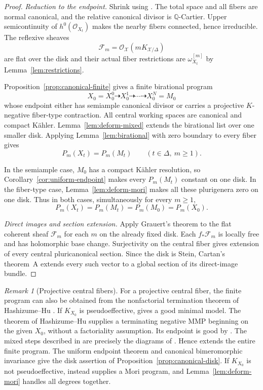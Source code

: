 \documentclass[11pt,a4paper]{article}
\numberwithin{equation}{section}
\theoremstyle{definition}
\theoremstyle{remark}
\newtheorem{remark}[theorem]{Remark}
\newcommand{\Q}{\mathbb Q}\newcommand{\R}{\mathbb R}
\newcommand{\OO}{\mathcal O}\newcommand{\cX}{\mathcal X}
\begin{document}
\begin{proof}
\emph{Reduction to the endpoint.}
Shrink using \cite[Lemma~10 and Remark~10.3]{Kollar2021}.
The total space and all fibers are normal canonical, and the
relative canonical divisor is $\Q$-Cartier. Upper semicontinuity of
$h^0(\OO_{X_t})$ makes the nearby fibers connected, hence irreducible.
The reflexive sheaves
\[
 \mathcal F_m=\OO_{\mathcal X}(mK_{\mathcal X/\Delta})
\]
are flat over the disk and their actual fiber restrictions are
$\omega_{X_t}^{[m]}$ by Lemma~\ref{lem:restrictions}.

Proposition~\ref{prop:canonical-finite} gives a finite
birational program
\[
 X_0=X_0^0\dashrightarrow X_0^1\dashrightarrow\cdots
 \dashrightarrow X_0^N=M_0
\]
whose endpoint either has semiample canonical divisor or carries
a projective $K$-negative fiber-type contraction.
All central working spaces are canonical and compact Kähler.
Lemma~\ref{lem:deform-mixed} extends the birational list over
one smaller disk. Applying Lemma~\ref{lem:birational} with zero
boundary to every fiber gives
\begin{equation}\label{eq:canonical-birational-invariance}
 P_m(X_t)=P_m(M_t)\qquad(t\in\Delta,\ m\ge1).
\end{equation}

In the semiample case, $M_0$ has a compact Kähler resolution,
so Corollary~\ref{cor:uniform-endpoint} makes every $P_m(M_t)$
constant on one disk. In the fiber-type case,
Lemma~\ref{lem:deform-mori} makes all these plurigenera zero on
one disk. Thus in both cases, simultaneously for every $m\ge1$,
\[
 P_m(X_t)=P_m(M_t)=P_m(M_0)=P_m(X_0).
\]

\smallskip\noindent\emph{Direct images and section extension.}
Apply Grauert's theorem to the flat coherent sheaf
$\mathcal F_m$ for each $m$ on the already fixed disk.
Each $f_*\mathcal F_m$ is locally free and has holomorphic base
change. Surjectivity on the central fiber gives extension of every
central pluricanonical section. Since the disk is Stein, Cartan's theorem~A extends every such
vector to a global section of its direct-image bundle.
\end{proof}

\begin{remark}[Projective central fibers]
For a projective central fiber, the finite program can also be obtained
from the nonfactorial termination theorem of Hashizume--Hu
\cite[Theorem~1.7]{HH2020}. If $K_{X_0}$ is
pseudoeffective, \cite[Proposition~2.10]{OAI034} gives a good
minimal model. The theorem of Hashizume--Hu supplies a terminating
negative MMP beginning on the given $X_0$, without a factoriality
assumption. Its endpoint is
good by \cite[Lemma~2.10]{TX2024}. The mixed steps described in
\cite[Remark~2.15]{TX2024} are precisely the diagrams of
\cite[Definition~7]{Kollar2021}. Hence
\cite[Theorem~2]{Kollar2021} extends the entire finite program.
The uniform endpoint theorem and canonical bimeromorphic invariance
give the disk assertion of Proposition~\ref{prop:canonical-disk}.
If $K_{X_0}$ is not pseudoeffective,
\cite[Theorem~1.7]{HH2020} instead supplies a Mori program,
and Lemma~\ref{lem:deform-mori} handles all degrees together.
\end{remark}
\end{document}
